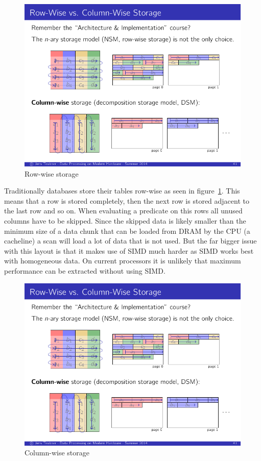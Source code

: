 \begin{figure}[h] \begin{center}
\includegraphics[scale=1.25]{images/rowstore}
\end{center}
\caption{Row-wise storage~\cite{JensDPMH}}
\label{fig:rowstore}
\end{figure}

Traditionally databases store their tables row-wise as seen in
figure~\ref{fig:rowstore}. This means that a row is stored completely, then the
next row is stored adjacent to the last row and so on. When evaluating a
predicate on this rows all unused columns have to be skipped. Since the skipped
data is likely smaller than the minimum size of a data chunk that can be loaded
from DRAM by the CPU (a cacheline) a scan will load a lot of data that is not
used. But the far bigger issue with this layout is that it makes use of SIMD
much harder as SIMD works best with homogeneous data. On current processors it
is unlikely that maximum performance can be extracted without using SIMD.

\begin{figure}[h] \begin{center}
\includegraphics[scale=1.25]{images/colstore}
\end{center}
\caption{Column-wise storage~\cite{JensDPMH}}
\label{fig:colstore}
\end{figure}

